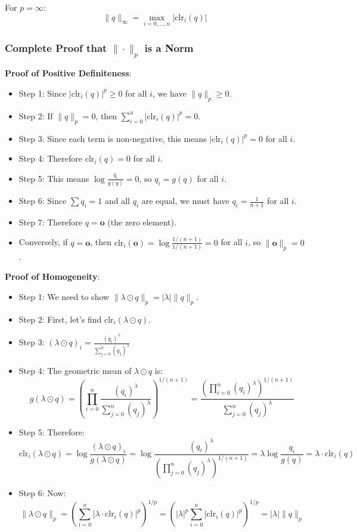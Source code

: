 \documentclass{amsart}
\theoremstyle{plain}
\theoremstyle{definition}
\theoremstyle{remark}
\begin{document}
For $p = \infty$:
\[
\|q\|_\infty = \max_{i=0,\ldots,n} |\text{clr}_i(q)|
\]

\subsubsection{Complete Proof that \texorpdfstring{$\|\cdot\|_p$}{|cdot|_p} is a Norm}

\textbf{Proof of Positive Definiteness}:

\begin{itemize}
	\item Step 1: Since $|\text{clr}_i(q)|^p \geq 0$ for all $i$, we have $\|q\|_p \geq 0$.
	\item Step 2: If $\|q\|_p = 0$, then $\sum_{i=0}^n |\text{clr}_i(q)|^p = 0$.
	\item Step 3: Since each term is non-negative, this means $|\text{clr}_i(q)|^p = 0$ for all $i$.
	\item Step 4: Therefore $\text{clr}_i(q) = 0$ for all $i$.
	\item Step 5: This means $\log\frac{q_i}{g(q)} = 0$, so $q_i = g(q)$ for all $i$.
	\item Step 6: Since $\sum q_i = 1$ and all $q_i$ are equal, we must have $q_i = \frac{1}{n+1}$ for all $i$.
	\item Step 7: Therefore $q = \mathbf{o}$ (the zero element).
	\item Conversely, if $q = \mathbf{o}$, then $\text{clr}_i(\mathbf{o}) = \log\frac{1/(n+1)}{1/(n+1)} = 0$ for all $i$, so $\|\mathbf{o}\|_p = 0$.
\end{itemize}

\textbf{Proof of Homogeneity}:

\begin{itemize}
	\item Step 1: We need to show $\|\lambda \odot q\|_p = |\lambda| \|q\|_p$.
	\item Step 2: First, let's find $\text{clr}_i(\lambda \odot q)$.
	\item Step 3: $(\lambda \odot q)_i = \frac{(q_i)^\lambda}{\sum_{j=0}^n (q_j)^\lambda}$
	\item Step 4: The geometric mean of $\lambda \odot q$ is:
\[
g(\lambda \odot q) = \left(\prod_{i=0}^n \frac{(q_i)^\lambda}{\sum_{j=0}^n (q_j)^\lambda}\right)^{1/(n+1)} = \frac{\left(\prod_{i=0}^n (q_i)^\lambda\right)^{1/(n+1)}}{\sum_{j=0}^n (q_j)^\lambda}
\]
	\item Step 5: Therefore:
\[
\text{clr}_i(\lambda \odot q) = \log\frac{(\lambda \odot q)_i}{g(\lambda \odot q)} = \log\frac{(q_i)^\lambda}{\left(\prod_{j=0}^n (q_j)^\lambda\right)^{1/(n+1)}} = \lambda \log\frac{q_i}{g(q)} = \lambda \cdot \text{clr}_i(q)
\]
	\item Step 6: Now:
\[
\|\lambda \odot q\|_p = \left(\sum_{i=0}^n |\lambda \cdot \text{clr}_i(q)|^p\right)^{1/p} = \left(|\lambda|^p \sum_{i=0}^n |\text{clr}_i(q)|^p\right)^{1/p} = |\lambda| \|q\|_p
\]
\end{itemize}
\end{document}
